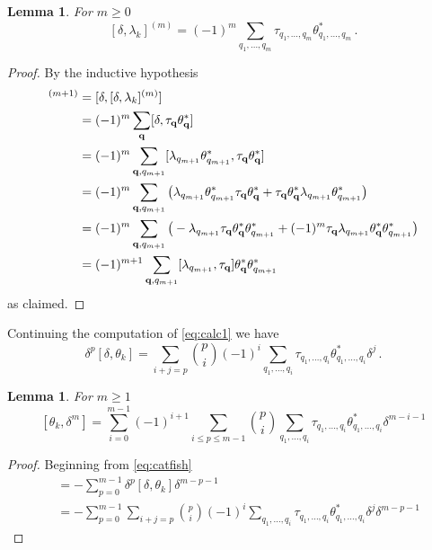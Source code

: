 \documentclass[english,letter paper,12pt,leqno]{article}
\newtheorem{lemma}[theorem]{Lemma}
\theoremstyle{example}
\numberwithin{equation}{section}
\begin{document}
\begin{lemma} For $m \ge 0$
\[
[ \delta, \lambda_k ]^{(m)} = (-1)^m \sum_{q_1,\ldots,q_m} \tau_{q_1,\ldots,q_m} \theta^*_{q_1,\ldots,q_m}\,.
\]
\end{lemma}
\begin{proof}
By the inductive hypothesis
\begin{align*}
[\delta, \lambda_k]^{(m+1)} &= [ \delta, [ \delta, \lambda_k ]^{(m)} ]\\
&= (-1)^m \sum_{\bold{q}} [ \delta, \tau_{\bold{q}} \theta_{\bold{q}}^* ]\\
&= (-1)^m \sum_{\bold{q}, q_{m+1}} [ \lambda_{q_{m+1}} \theta_{q_{m+1}}^*, \tau_{\bold{q}} \theta_{\bold{q}}^* ]\\
&= (-1)^m \sum_{\bold{q}, q_{m+1}} \big( \lambda_{q_{m+1}} \theta_{q_{m+1}}^* \tau_{\bold{q}} \theta_{\bold{q}}^* + \tau_{\bold{q}} \theta_{\bold{q}}^* \lambda_{q_{m+1}} \theta_{q_{m+1}}^* \big)\\
&= (-1)^m \sum_{\bold{q}, q_{m+1}} \big( -\lambda_{q_{m+1}} \tau_{\bold{q}}  \theta_{\bold{q}}^* \theta_{q_{m+1}}^* + (-1)^m \tau_{\bold{q}} \lambda_{q_{m+1}} \theta_{\bold{q}}^* \theta_{q_{m+1}}^* \big)\\
&= (-1)^{m+1} \sum_{\bold{q}, q_{m+1}} [ \lambda_{q_{m+1}}, \tau_{\bold{q}} ] \theta_{\bold{q}}^* \theta_{q_{m+1}}^*
\end{align*}
as claimed.
\end{proof}

Continuing the computation of \eqref{eq:calc1} we have
\begin{equation}
\label{eq:calc2}
\delta^p [\delta, \theta_k ] = \sum_{i+j=p} \binom{p}{i} (-1)^i \sum_{q_1,\ldots,q_i} \tau_{q_1,\ldots,q_i} \theta^*_{q_1,\ldots,q_i} \delta^j\,.
\end{equation}

\begin{lemma}\label{lemma:commutator_wha} For $m \ge 1$
\[
[ \theta_k, \delta^m ] = \sum_{i=0}^{m-1} (-1)^{i+1} \sum_{i \le p \le m -1} \binom{p}{i} \sum_{q_1,\ldots,q_i} \tau_{q_1,\ldots,q_i} \theta_{q_1,\ldots,q_i}^* \delta^{m-i-1}
\]
\end{lemma}
\begin{proof} 
Beginning from \eqref{eq:catfish}
\begin{align*}
[ \theta_k, \delta^m ] &= - \sum_{p=0}^{m-1} \delta^p [ \delta, \theta_k ] \delta^{m-p-1}\\
&= - \sum_{p=0}^{m-1} \sum_{i+j=p} \binom{p}{i} (-1)^i \sum_{q_1,\ldots,q_i} \tau_{q_1,\ldots,q_i} \theta^*_{q_1,\ldots,q_i} \delta^j \delta^{m-p-1}
\end{align*}
\end{proof}
\end{document}
